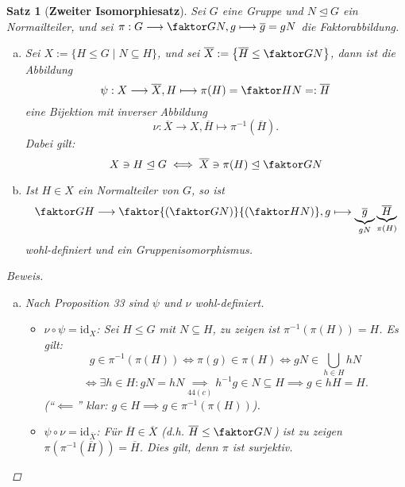 \documentclass[a4paper]{report}
\theoremstyle{plain}
\newtheorem{satz}[thm]{Satz}
\theoremstyle{definition}
\begin{document}
\begin{satz}[\textbf{Zweiter Isomorphiesatz}]
  Sei $G$ eine Gruppe und $N \trianglelefteq G$ ein Normailteiler, und sei $\pi : G \longrightarrow \faktor GN, g \longmapsto \overline g = gN $ die Faktorabbildung.
  \begin{enumerate}[(a)]
    \item Sei $X:= \{H \le G \mid N \subseteq H\}$, und sei $\overline X := \left\{\overline H \le \faktor GN\right\}$, dann ist die Abbildung $$\psi : X \longrightarrow \overline X, H \longmapsto \pi(H) = \faktor HN =: \overline H$$
          eine Bijektion mit inverser Abbildung $$\nu: \overline X \longrightarrow X, \overline H \longmapsto \pi^{-1}(\overline H).$$
          Dabei gilt:
          $$X \ni H \trianglelefteq G \iff \overline X \ni \pi(H) \trianglelefteq \faktor GN$$
    \item Ist $H \in X$ ein Normalteiler von $G$, so ist
          $$\faktor GH \longrightarrow \faktor{\left(\faktor GN\right)}{\left(\faktor HN \right)}, g \longmapsto \underbrace{\overline g}_{gN} \underbrace{\overline H}_{\pi(H)}$$
          wohl-definiert und ein Gruppenisomorphismus.
  \end{enumerate}
\begin{proof}[Beweis]
  \begin{enumerate}[(a)]
    \item Nach Proposition 33 sind $\psi$ und $\nu$ wohl-definiert.
\begin{itemize}

          \item $\nu \circ \psi = \mathrm{id}_{X}$: Sei $H \le G$ mit $N \subseteq H$, zu zeigen ist $\pi^{-1}(\pi(H)) = H$. Es gilt:
          $$g \in \pi^{-1}(\pi(H)) \iff \pi(g) \in \pi(H) \iff gN \in \bigcup_{h \in H}hN$$
          $$\iff \exists h \in H : gN = hN \underset{44(c)}\implies h^{-1}g \in N \subseteq H \implies g \in hH = H.$$
          (``$\impliedby$'' klar: $g \in H \implies g \in \pi^{-1}(\pi(H))$).

          \item $\psi \circ \nu = \mathrm{id}_{\overline X}$: Für $\overline H \in \overline X$ (d.h. $\overline H \le \faktor GN$) ist zu zeigen $\pi(\pi^{-1}(\overline H)) = \overline H$. Dies gilt, denn $\pi$ ist surjektiv.


\end{itemize}
\end{enumerate}
\end{proof}
\end{satz}
\end{document}
